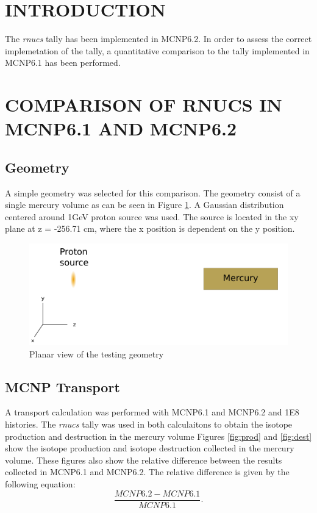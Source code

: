 \section{INTRODUCTION}

The \textit{rnucs} tally has been implemented in MCNP6.2. In order
to assess the correct implemetation of the tally, a quantitative
comparison to the tally implemented in MCNP6.1 has been performed.

\section{COMPARISON OF RNUCS IN MCNP6.1 AND MCNP6.2}

\subsection{Geometry}
A simple geometry was selected for this comparison. 
The geometry consist of a single mercury volume as can be seen in Figure \ref{fig:merbox.png}.
A Gaussian distribution centered around 1GeV proton source was used. 
The source is located in the xy plane at z = -256.71 cm, where the x position is
dependent on the y position. 


\begin{figure}[h!]
        \centering
        \includegraphics[scale=0.7]{figs/mercury.png}
        \caption[VPI]{Planar view of the testing geometry}
        \label{fig:merbox.png}
\end{figure}


\subsection{MCNP Transport}
A transport calculation was performed with MCNP6.1 and MCNP6.2 and 1E8 histories.
The \textit{rnucs} tally was used in both calculaitons to obtain
the isotope production and destruction in the mercury volume
Figures \ref{fig:prod} and \ref{fig:dest}  show the isotope production
and isotope destruction collected in the mercury volume. These figures also
show the relative difference between the results collected in MCNP6.1
and MCNP6.2. 
The relative difference is given by the following equation:
\begin{equation}
	\frac{MCNP6.2 - MCNP6.1}{MCNP6.1}.
\end{equation}


